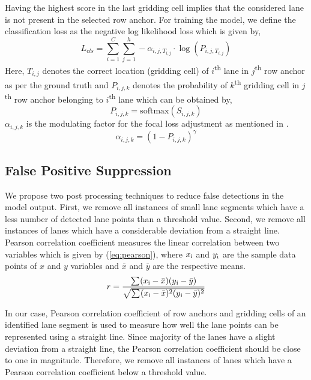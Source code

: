 \documentclass[conference]{IEEEtran}
\begin{document}
Having the highest score in the last gridding cell implies that the considered lane is not present in the selected row anchor. For training the model, we define the classification loss as the negative log likelihood loss which is given by, 
\begin{equation}
\label{eq:classLoss}
L_{cls}= \sum_{i=1}^{C} \sum_{j=1}^{h} -\alpha_{i,j,T_{i,j}} \cdot \log( P_{i,j,T_{i,j}})
\end{equation}
Here, $T_{i,j}$ denotes the correct location (gridding cell) of $i$\textsuperscript{th} lane in $j$\textsuperscript{th} row anchor as per the ground truth and $P_{i,j,k}$ denotes the probability of $k$\textsuperscript{th} gridding cell in $j$\textsuperscript{th} row anchor belonging to $i$\textsuperscript{th} lane which can be obtained by,
\begin{equation}
\label{eq:prob}
P_{i,j,k}=\mathrm{softmax}(S_{i,j,k})
\end{equation}
 $\alpha_{i,j,k}$ is the modulating factor for the focal loss adjustment as mentioned in \cite{lin2017focal}.  
\begin{equation}
\label{eq:alpha}
\alpha_{i,j,k}=(1-P_{i,j,k})^{\gamma}
\end{equation}

\subsection{False Positive Suppression}
\label{ssec:FPSup}

We propose two post processing techniques to reduce false detections in the model output. First, we remove all instances of small lane segments which have a less number of detected lane points than a threshold value. Second, we remove all instances of lanes which have a considerable deviation from a straight line. Pearson correlation coefficient measures the linear correlation between two variables which is given by (\ref{eq:pearson}), where $x \textsubscript{i}$ and $y\textsubscript{i}$ are the sample data points of $x$ and $y$ variables and $\bar{x}$ and $\bar{y}$ are the respective means. 
\begin{equation}
\label{eq:pearson}
r= \frac{\sum_{}^{}(x\textsubscript{i}-\bar{x})(y\textsubscript{i} - \bar{y})}{\sqrt{\sum_{}^{}(x\textsubscript{i}-\bar{x})^{2}(y\textsubscript{i} - \bar{y})^{2}}}
\end{equation}

In our case, Pearson correlation coefficient of row anchors and gridding cells of an identified lane segment is used to measure how well the lane points can be represented using a straight line. Since majority of the lanes have a slight deviation from a straight line, the Pearson correlation coefficient should be close to one in magnitude. Therefore, we remove all instances of lanes which have a Pearson correlation coefficient below a threshold value.
\end{document}
